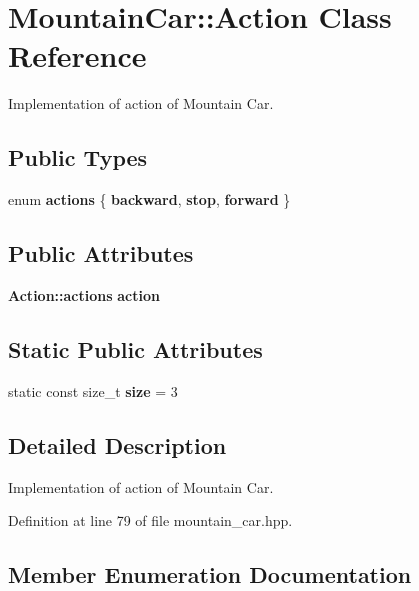\section{Mountain\+Car\+:\+:Action Class Reference}
\label{classmlpack_1_1rl_1_1MountainCar_1_1Action}


Implementation of action of Mountain Car.  


\subsection*{Public Types}
\begin{DoxyCompactItemize}
\item 
enum \textbf{ actions} \{ \newline
\textbf{ backward}, 
\newline
\textbf{ stop}, 
\newline
\textbf{ forward}
 \}
\end{DoxyCompactItemize}
\subsection*{Public Attributes}
\begin{DoxyCompactItemize}
\item 
\textbf{ Action\+::actions} \textbf{ action}
\end{DoxyCompactItemize}
\subsection*{Static Public Attributes}
\begin{DoxyCompactItemize}
\item 
static const size\+\_\+t \textbf{ size} = 3
\end{DoxyCompactItemize}


\subsection{Detailed Description}
Implementation of action of Mountain Car. 

Definition at line 79 of file mountain\+\_\+car.\+hpp.



\subsection{Member Enumeration Documentation}
\mbox{\label{classmlpack_1_1rl_1_1MountainCar_1_1Action_af806efc6052edbc741683ec893bb2fe1}} 
